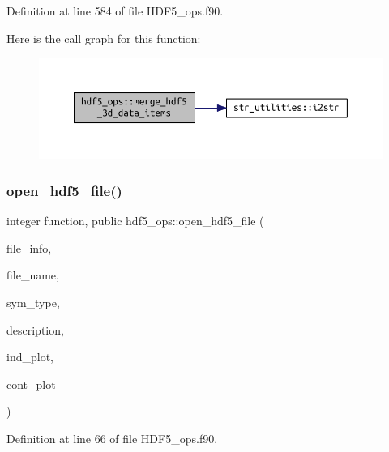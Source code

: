 Definition at line 584 of file H\+D\+F5\+\_\+ops.\+f90.

Here is the call graph for this function\+:
\nopagebreak
\begin{figure}[H]
\begin{center}
\leavevmode
\includegraphics[width=350pt]{namespacehdf5__ops_a7b18b66402089eef2288b2d532f6af5d_cgraph}
\end{center}
\end{figure}
\mbox{\label{namespacehdf5__ops_a28cdecb45d88592a69dada6fd5ab9919}} 
\subsubsection{\texorpdfstring{open\+\_\+hdf5\+\_\+file()}{open\_hdf5\_file()}}
{\footnotesize\ttfamily integer function, public hdf5\+\_\+ops\+::open\+\_\+hdf5\+\_\+file (\begin{DoxyParamCaption}\item[{type(hdf5\+\_\+file\+\_\+type), intent(inout)}]{file\+\_\+info,  }\item[{character(len=$\ast$), intent(in)}]{file\+\_\+name,  }\item[{integer, intent(inout), optional}]{sym\+\_\+type,  }\item[{character(len=$\ast$), intent(in), optional}]{description,  }\item[{logical, intent(in), optional}]{ind\+\_\+plot,  }\item[{logical, intent(in), optional}]{cont\+\_\+plot }\end{DoxyParamCaption})}



Definition at line 66 of file H\+D\+F5\+\_\+ops.\+f90.

